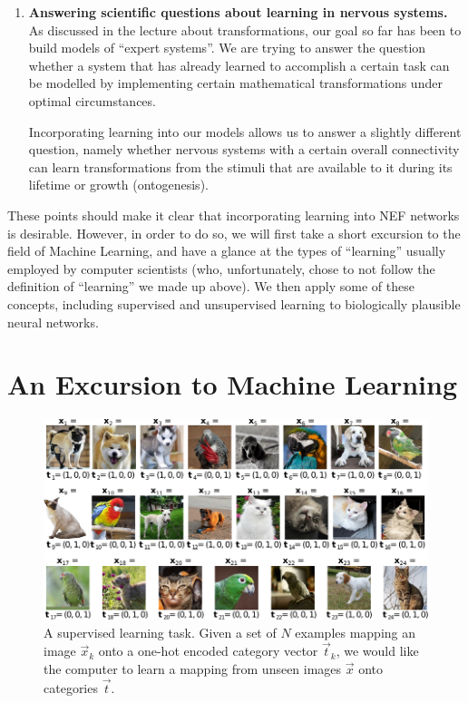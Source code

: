 \documentclass[10pt,letterpaper,oneside]{article}
\begin{document}
\begin{enumerate}[1.]
	\item \textbf{Answering scientific questions about learning in nervous systems.}\\
	As discussed in the lecture about transformations, our goal so far has been to build models of \enquote{expert systems}. We are trying to answer the question whether a system that has already learned to accomplish a certain task can be modelled by implementing certain mathematical transformations under optimal circumstances.

	Incorporating learning into our models allows us to answer a slightly different question, namely whether nervous systems with a certain overall connectivity can learn transformations from the stimuli that are available to it during its lifetime or growth (ontogenesis).
\end{enumerate}

These points should make it clear that incorporating learning into NEF networks is desirable. However, in order to do so, we will first take a short excursion to the field of Machine Learning, and have a glance at the types of \enquote{learning} usually employed by computer scientists (who, unfortunately, chose to not follow the definition of \enquote{learning} we made up above). We then apply some of these concepts, including supervised and unsupervised learning to biologically plausible neural networks.

\section{An Excursion to Machine Learning}

\begin{figure}
	\centering
	\includegraphics{media/learning_example_supervised.pdf}
	\caption{A supervised learning task. Given a set of $N$ examples mapping an image $\vec x_k$ onto a one-hot encoded category vector $\vec t_k$, we would like the computer to learn a mapping from unseen images $\vec x$ onto categories $\vec t$.}
	\label{fig:learning_example_supervised}
\end{figure}
\end{document}
